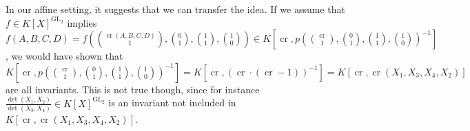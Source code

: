 In our affine setting, it suggests that we can transfer the idea.
If we assume that $f \in K[X]^{\operatorname{GL}_2}$ implies $f(A,B,C,D)=f(\binom{\operatorname{cr}(A,B,C,D)}{1},\binom{0}{1},\binom{1}{1},\binom{1}{0}) \in K[\operatorname{cr},p(\binom{\operatorname{cr}}{1},\binom{0}{1},\binom{1}{1},\binom{1}{0})^{-1}]$, we would have shown that \linebreak$K[\operatorname{cr},p(\binom{\operatorname{cr}}{1},\binom{0}{1},\binom{1}{1},\binom{1}{0})^{-1}] = K[\operatorname{cr},(\operatorname{cr}\cdot(\operatorname{cr}-1))^{-1}] = K[\operatorname{cr},\operatorname{cr}(X_1,X_3,X_4,X_2)]$ are all invariants.
This is not true though, since for instance \linebreak$\frac{\operatorname{det}(X_1,X_2)}{\operatorname{det}(X_3,X_4)} \in K[X]^{\operatorname{GL}_2}$ is an invariant not included in $K[\operatorname{cr},\operatorname{cr}(X_1,X_3,X_4,X_2)]$.


